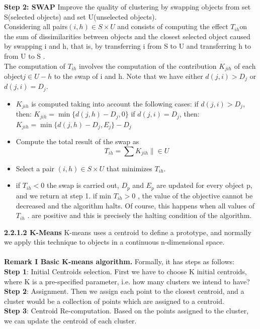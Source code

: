 \documentclass[a4paper,12pt,fleqn]{article}
\begin{document}
\textbf{Step 2: SWAP}  Improve the quality of clustering by swapping objects from set S(selected objects) and set U(unselected objects).\\
Considering all pairs$(i,h) \in S \times U$  and consists of computing the effect $T_{ih} $on the sum of dissimilarities between objects and the closest selected object caused by swapping i and h, that is, by transferring i from S to U  and transferring h to from U to S . \\
The computation of $T_{ih} $ involves the computation of the contribution $K_{jih}$ of each object$ j \in U - {h}$ to the swap of i and h. Note that we have either $d(j,i) > D_j$ or $d(j,i) = D_j$.
\begin{itemize}
	\item $K_{jih}$ is computed taking into account the following cases: 
	\subitem if $d(j,i) >D_j$, then: $K_{jih}= \min \{d(j,h)-D_j, 0\}$
	\subitem if $d(j,i)=D_j$, then: $K_{jih}= \min \{d(j,h)-D_j, E_j\}-D_j$	
	\item Compute the total result of the swap as 
	\begin{equation*}
	T_{ih}=\sum{K_{jih}\| \in U}
	\end{equation*}
	\item Select a pair $(i,h) \in S \times U$ that minimizes $T_{ih}$.
	\item if $T_{ih}<0$ the swap is carried out, $D_p$ and $E_p$ are updated for every object p, and we return at step 1. if min $T_{ih}>0$ , the value of the objective cannot be decreased and the algorithm halts. Of course, this happens when all values of $T_{ih}$ .	are positive and this is precisely the halting condition of the algorithm. 
\end{itemize}
\textbf{2.2.1.2 K-Means}
K-means uses a centroid to define a prototype, and normally we apply this technique to objects in a continuous n-dimensional space.\\
\\
\textbf{Remark I Basic K-means algorithm. }
Formally, it has steps as follows:\\
\textbf{Step 1}: Initial Centroids selection. First we have to choose K initial centroids, where K is a pre-specified parameter, i.e. how many clusters we intend to have?\\
\textbf{Step 2}: Assignment. Then we assign each point to the closest centroid, and a cluster would be a collection of points which are assigned to a centroid.\\
\textbf{Step 3}: Centroid Re-computation. Based on the points assigned to the cluster, we can update the centroid of each cluster.\\
\end{document}
